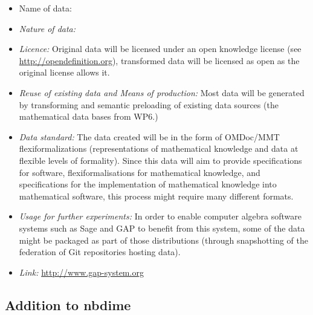 \documentclass{../../Proposal/LaTeX-proposal/deliverablereport}
\begin{document}
\begin{itemize}
\item{Name of data:}
\item\textit{Nature of data:}
\item\textit{Licence:} Original data will be licensed under an open knowledge license (see \url{http://opendefinition.org}), transformed data will be licensed as open as the original license allows it.
\item\textit{Reuse of existing data and Means of production:} Most data will be generated by transforming and semantic preloading of existing data sources (the mathematical data bases from WP6.)
\item\textit{Data standard:} The data created will be in the form of OMDoc/MMT flexiformalizations (representations of mathematical knowledge and data at flexible levels of formality). Since this data will aim to provide specifications for software, flexiformalisations for mathematical knowledge, and specifications for the implementation of mathematical knowledge into mathematical software, this process might require many different formats.
\item\textit{Usage for further experiments:} In order to enable computer algebra software systems such as Sage and GAP to benefit from this system, some of the data might be packaged as part of those distributions (through snapshotting of the federation of Git repositories hosting data).
\item\textit{Link:} \href{http://www.gap-system.org}{http://www.gap-system.org}
\end{itemize}


\subsection{Addition to nbdime}
\end{document}

